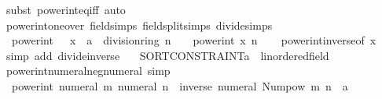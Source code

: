 \begin{isabellebody}
\ {\isacharparenleft}{\kern0pt}subst\ power{\isacharunderscore}{\kern0pt}int{\isacharunderscore}{\kern0pt}eq{\isacharunderscore}{\kern0pt}{}{\isacharunderscore}{\kern0pt}iff{\isacharparenright}{\kern0pt}\ auto%
\endisatagproof
{\isafoldproof}%
%
\isadelimproof
\isanewline
%
\endisadelimproof
\isanewline
{}\isamarkupfalse%
\ power{\isacharunderscore}{\kern0pt}int{\isacharunderscore}{\kern0pt}one{\isacharunderscore}{\kern0pt}over\ {\isacharbrackleft}{\kern0pt}field{\isacharunderscore}{\kern0pt}simps{\isacharcomma}{\kern0pt}\ field{\isacharunderscore}{\kern0pt}split{\isacharunderscore}{\kern0pt}simps{\isacharcomma}{\kern0pt}\ divide{\isacharunderscore}{\kern0pt}simps{\isacharbrackright}{\kern0pt}{\isacharcolon}{\kern0pt}\isanewline
\ \ {\isachardoublequoteopen}power{\isacharunderscore}{\kern0pt}int\ {\isacharparenleft}{\kern0pt}{}\ {\isacharslash}{\kern0pt}\ x\ {\isacharcolon}{\kern0pt}{\isacharcolon}{\kern0pt}\ {\isacharprime}{\kern0pt}a\ {\isacharcolon}{\kern0pt}{\isacharcolon}{\kern0pt}\ division{\isacharunderscore}{\kern0pt}ring{\isacharparenright}{\kern0pt}\ n\ {\isacharequal}{\kern0pt}\ {}\ {\isacharslash}{\kern0pt}\ power{\isacharunderscore}{\kern0pt}int\ x\ n{\isachardoublequoteclose}\isanewline
%
\isadelimproof
\ \ %
\endisadelimproof
%
\isatagproof
{}\isamarkupfalse%
\ power{\isacharunderscore}{\kern0pt}int{\isacharunderscore}{\kern0pt}inverse{\isacharbrackleft}{\kern0pt}of\ x{\isacharbrackright}{\kern0pt}\ \isamarkupfalse%
\ {\isacharparenleft}{\kern0pt}simp\ add{\isacharcolon}{\kern0pt}\ divide{\isacharunderscore}{\kern0pt}inverse{\isacharparenright}{\kern0pt}%
\endisatagproof
{\isafoldproof}%
%
\isadelimproof
\isanewline
%
\endisadelimproof
\isanewline
\isanewline
{}\isamarkupfalse%
\isanewline
\ \ \ {\isachardoublequoteopen}SORT{\isacharunderscore}{\kern0pt}CONSTRAINT{\isacharparenleft}{\kern0pt}{\isacharprime}{\kern0pt}a\ {\isacharcolon}{\kern0pt}{\isacharcolon}{\kern0pt}\ linordered{\isacharunderscore}{\kern0pt}field{\isacharparenright}{\kern0pt}{\isachardoublequoteclose}\isanewline
{}\isanewline
\isanewline
{}\isamarkupfalse%
\ power{\isacharunderscore}{\kern0pt}int{\isacharunderscore}{\kern0pt}numeral{\isacharunderscore}{\kern0pt}neg{\isacharunderscore}{\kern0pt}numeral\ {\isacharbrackleft}{\kern0pt}simp{\isacharbrackright}{\kern0pt}{\isacharcolon}{\kern0pt}\isanewline
\ \ {\isachardoublequoteopen}power{\isacharunderscore}{\kern0pt}int\ {\isacharparenleft}{\kern0pt}numeral\ m{\isacharparenright}{\kern0pt}\ {\isacharparenleft}{\kern0pt}{\isacharminus}{\kern0pt}numeral\ n{\isacharparenright}{\kern0pt}\ {\isacharequal}{\kern0pt}\ {\isacharparenleft}{\kern0pt}inverse\ {\isacharparenleft}{\kern0pt}numeral\ {\isacharparenleft}{\kern0pt}Num{\isachardot}{\kern0pt}pow\ m\ n{\isacharparenright}{\kern0pt}{\isacharparenright}{\kern0pt}\ {\isacharcolon}{\kern0pt}{\isacharcolon}{\kern0pt}\ {\isacharprime}{\kern0pt}a{\isacharparenright}{\kern0pt}{\isachardoublequoteclose}\isanewline

\end{isabellebody}

